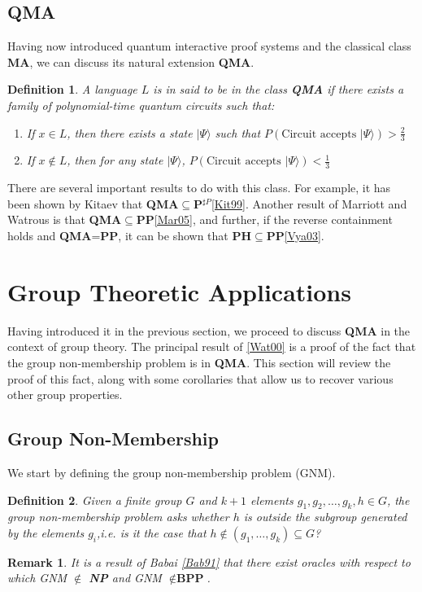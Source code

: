 \documentclass[12pt]{article}
\newtheorem{defn}{Definition}
\newtheorem{rmk}{Remark}
\numberwithin{thm}{section}
\numberwithin{defn}{section}
\numberwithin{prop}{section}
\numberwithin{rmk}{section}
\newcommand{\ket}[1]{\vert #1 \rangle}
\begin{document}
	\subsection{QMA}
	Having now introduced quantum interactive proof systems and the classical class \textbf{MA}, we can discuss its natural extension \textbf{QMA}.
	\begin{defn}
		A language $L$ is in said to be in the class \textbf{QMA} if there exists a family of polynomial-time quantum circuits such that:
		\begin{enumerate}
			\item If $x\in L$, then there exists a state $\ket{\Psi}$ such that $P(\text{Circuit accepts } \ket{\Psi})>\frac{2}{3}$
			\item If $x\notin L$, then for any state $\ket{\Psi}$, $P(\text{Circuit accepts } \ket{\Psi})<\frac{1}{3}$
		\end{enumerate}
	\end{defn}
	 There are several important results to do with this class. For example, it has been shown by Kitaev that \textbf{QMA}$\subseteq$\textbf{P$^{\sharp P}$}\hyperref[kit99]{[Kit99]}. Another result of Marriott and Watrous is that \textbf{QMA}$\subseteq$\textbf{PP}\hyperref[mar05]{[Mar05]}, and further, if the reverse containment holds and \textbf{QMA}=\textbf{PP}, it can be shown that \textbf{PH}$\subseteq$\textbf{PP}\hyperref[vya03]{[Vya03]}.
    \section{Group Theoretic Applications}
    Having introduced it in the previous section, we proceed to discuss \textbf{QMA} in the context of group theory. The principal result of \hyperref[wat00]{[Wat00]} is a proof of the fact that the group non-membership problem is in \textbf{QMA}. This section will review the proof of this fact, along with some corollaries that allow us to recover various other group properties. 
    \subsection{Group Non-Membership}
    We start by defining the group non-membership problem (GNM).
    \begin{defn}
    	Given a finite group $G$ and $k+1$ elements $g_1,g_2,\dots,g_k,h\in G$, the group non-membership problem asks whether $h$ is outside the subgroup generated by the elements $g_i$,i.e. is it the case that $h\notin (g_1,\dots,g_k)\subseteq G$?
    \end{defn}
	\begin{rmk}
	It is a result of Babai \hyperref[bab91]{[Bab91]} that there exist oracles with respect to which GNM $\notin$ \textbf{NP} and GNM $\notin\textbf{BPP}$.
	\end{rmk}
	
\end{document}
